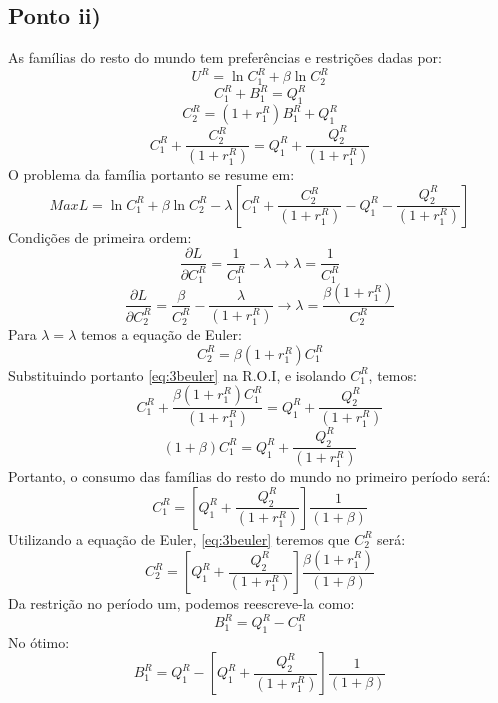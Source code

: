 \documentclass{article}
\begin{document}
\subsection*{Ponto ii)}
As famílias do resto do mundo tem preferências e restrições dadas por:
    $$U^{R}=\ln C_1^R + \beta\ln C_2^R$$
   $$C_1^{R}+B_1^{R}=Q_1^{R}$$
   $$C_2^{R}=(1+r_1^R)B_1^{R}+Q_1^{R}$$
   $$C_1^{R}+\frac{C_2^{R}}{(1+r_1^R)}=Q_1^{R}+\frac{Q_2^{R}}{(1+r_1^R)}$$
O problema da família portanto se resume em:
\begin{equation}
    Max L = \ln C_1^R + \beta\ln C_2^R-\lambda\left[C_1^{R}+\frac{C_2^{R}}{(1+r_1^R)}-Q_1^{R}-\frac{Q_2^{R}}{(1+r_1^R)}\right]
\end{equation}
Condições de primeira ordem:
\begin{equation}
    \frac{\partial L}{\partial C_1^R} = \frac{1}{C_1^R}-\lambda \to \lambda=\frac{1}{C_1^R}
\end{equation}
\begin{equation}
    \frac{\partial L}{\partial C_2^R} = \frac{\beta}{C_2^R}-\frac{\lambda}{(1+r_1^R)} \to \lambda=\frac{\beta(1+r_1^R)}{C_2^R}
\end{equation}
Para $\lambda=\lambda$ temos a equação de Euler:
\begin{equation}\label{eq:3beuler}
    C_2^R=\beta(1+r_1^R)C_1^R
\end{equation}
Substituindo portanto \eqref{eq:3beuler} na R.O.I, e isolando $C_1^R$, temos:
\begin{equation}
    C_1^{R}+\frac{\beta(1+r_1^R)C_1^R}{(1+r_1^R)}=Q_1^{R}+\frac{Q_2^{R}}{(1+r_1^R)}
\end{equation}
\begin{equation}
    (1+\beta)C_1^{R}=Q_1^{R}+\frac{Q_2^{R}}{(1+r_1^R)}
\end{equation}
Portanto, o consumo das famílias do resto do mundo no primeiro período será:
\begin{equation}
    C_1^{R}=\left[Q_1^{R}+\frac{Q_2^{R}}{(1+r_1^R)}\right]\frac{1}{(1+\beta)}
\end{equation}
Utilizando a equação de Euler, \eqref{eq:3beuler} teremos que $C_2^R$ será:
\begin{equation}
    C_2^{R}=\left[Q_1^{R}+\frac{Q_2^{R}}{(1+r_1^R)}\right]\frac{\beta(1+r_1^R)}{(1+\beta)}
\end{equation}
Da restrição no período um, podemos reescreve-la como:
\begin{equation}
    B_1^{R}=Q_1^{R}-C_1^{R}
\end{equation}
No ótimo:
\begin{equation}
    B_1^{R}=Q_1^{R}-\left[Q_1^{R}+\frac{Q_2^{R}}{(1+r_1^R)}\right]\frac{1}{(1+\beta)}
\end{equation}
\end{document}
